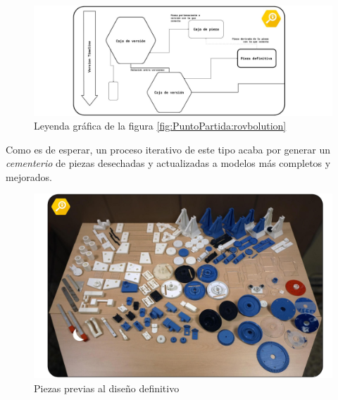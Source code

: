 \begin{figure}[h]
	\centering
	\includegraphics[width=\textwidth]{figuras/Imagenes_PuntoPartida/robvolution_legend.jpg}
	\caption{Leyenda gráfica de la figura \ref{fig:PuntoPartida:rovbolution}}
	\label{fig:PuntoPartida:rovbolution_legend}
\end{figure}
Como es de esperar, un proceso iterativo de este tipo acaba por generar un \textit{cementerio} de piezas desechadas y actualizadas a modelos más completos y mejorados.

\begin{figure}[h]
	\centering
	\includegraphics[width=\textwidth]{figuras/Imagenes_PuntoPartida/cementerio.jpg}
	\caption{Piezas previas al diseño definitivo}
	\label{fig:PuntoPartida:cementerio}
\end{figure}

